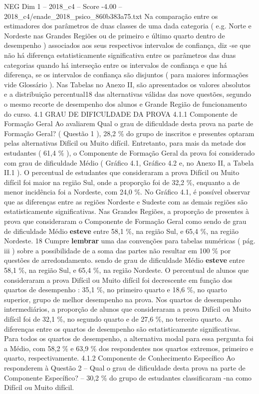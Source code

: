 \begin{textsample}{NEG Dim 1 – 2018\_c4 – Score -4.00 – 2018\_c4/enade\_2018\_psico\_860b383a75.txt}
Na comparação entre os estimadores dos parâmetros de duas classes de uma dada categoria ( e.g.
Norte e Nordeste nas Grandes Regiões ou de primeiro e último quarto dentro de desempenho ) associados aos seus respectivos intervalos de confiança, diz -se que não há diferença estatisticamente significativa entre os parâmetros das duas categorias quando há interseção entre os intervalos de confiança e que há diferença, se os intervalos de confiança são disjuntos ( para maiores informações vide Glossário ).
Nas Tabelas no Anexo II, são apresentados os valores absolutos e a distribuição percentual18 das alternativas válidas das nove questões, segundo o mesmo recorte de desempenho dos alunos e Grande Região de funcionamento do curso. 4.1 GRAU DE DIFICULDADE DA PROVA 4.1.1 Componente de Formação Geral Ao avaliarem Qual o grau de dificuldade desta prova na parte de Formação Geral? ( Questão 1 ), 28,2 \% do grupo de inscritos e presentes optaram pelas alternativas Difícil ou Muito difícil.
Entretanto, para mais da metade dos estudantes ( 61,4 \% ), o Componente de Formação Geral da prova foi considerado com grau de dificuldade Médio ( Gráfico 4.1, Gráfico 4.2 e, no Anexo II, a Tabela II.1 ).
O percentual de estudantes que consideraram a prova Difícil ou Muito difícil foi maior na região Sul, onde a proporção foi de 32,2 \%, enquanto a de menor incidência foi a Nordeste, com 24,0 \%.
No Gráfico 4.1, é possível observar que as diferenças entre as regiões Nordeste e Sudeste com as demais regiões são estatisticamente significativas.
Nas Grandes Regiões, a proporção de presentes à prova que consideraram o Componente de Formação Geral como sendo de grau de dificuldade Médio \textbf{esteve} entre 58,1 \%, na região Sul, e 65,4 \%, na região Nordeste. 18 Cumpre \textbf{lembrar} uma das convenções para tabelas numéricas ( pág. iii ) sobre a possibilidade de a soma das partes não resultar em 100 \% por questões de arredondamento. sendo de grau de dificuldade Médio \textbf{esteve} entre 58,1 \%, na região Sul, e 65,4 \%, na região Nordeste.
O percentual de alunos que consideraram a prova Difícil ou Muito difícil foi decrescente em função dos quartos de desempenho : 35,1 \%, no primeiro quarto e 18,6 \%, no quarto superior, grupo de melhor desempenho na prova.
Nos quartos de desempenho intermediários, a proporção de alunos que consideraram a prova Difícil ou Muito difícil foi de 32,1 \%, no segundo quarto e de 27,6 \%, no terceiro quarto.
As diferenças entre os quartos de desempenho são estatisticamente significativas.
Para todos os quartos de desempenho, a alternativa modal para essa pergunta foi a Médio, com 58,2 \% e 63,9 \% dos respondentes nos quartos extremos, primeiro e quarto, respectivamente. 4.1.2 Componente de Conhecimento Específico Ao responderem à Questão 2 – Qual o grau de dificuldade desta prova na parte de Componente Específico? – 30,2 \% do grupo de estudantes classificaram -na como Difícil ou Muito difícil.

\end{textsample}
